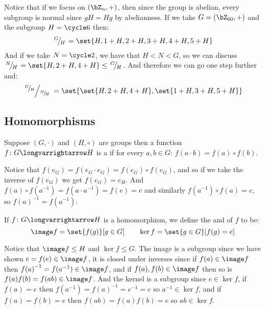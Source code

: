 \documentclass[10pt]{article}
\def\slfrac#1#2{\left.{}^{#1}\mkern-4mu\middle/\mkern-3mu{}_{#2}\right.}
\begin{document}


\bigskip

Notice that if we focus on $(\bZ_n,+)$, then since the group is abelian, every subgroup is normal since $gH=Hg$ by abelianness.
If we take $G=(\bZ_{60},+)$ and the subgroup $H=\cycle 6$ then:
\[ \slfrac GH = \set{H, 1+H, 2+H, 3+H, 4+H, 5+H} \]
And if we take $N=\cycle 2$, we have that $H<N<G$, so we can discuss $\slfrac NH=\set{H, 2+H, 4+H}\leq\slfrac GH$.
And therefore we can go one step further and:
\[ \slfrac{\slfrac GH}{\slfrac NH} = \set{\set{H, 2+H, 4+H}, \set{1+H, 3+H, 5+H}} \]

\subsection{Homomorphisms}

\begin{defn*}

    Suppose $(G,\cdot)$ and $(H,\circ)$ are groups then a function $f\colon G\longvarrightarrow H$ is a  if for every $a,b\in G$: $f(a\cdot b)=f(a)\circ f(b)$.

\end{defn*}

Notice that $f(e_G)=f(e_G\cdot e_G)=f(e_G)\circ f(e_G)$, and so if we take the inverse of $f(e_G)$ we get $f(e_G)=e_H$.
And $f(a)\circ f(a^{-1})=f(a\cdot a^{-1})=f(e)=e$ and similarly $f(a^{-1})\circ f(a)=e$, so ${f(a)}^{-1}=f(a^{-1})$.

\begin{defn*}

    If $f\colon G\longvarrightarrow H$ is a homomorphism, we define the  and  of $f$ to be:
    \[ \image f = \set{f(g)}[g\in G] \qquad \ker f = \set{g\in G}[f(g)=e] \]

\end{defn*}

Notice that $\image f\leq H$ and $\ker f\leq G$.
The image is a subgroup since we have shown $e=f(e)\in\image f$, it is closed under inverses since if $f(a)\in\image f$ then ${f(a)}^{-1}=f(a^{-1})\in\image f$, and if $f(a),f(b)\in\image f$ then so is
$f(a)f(b)=f(ab)\in\image f$.
And the kernel is a subgroup since $e\in\ker f$, if $f(a)=e$ then $f(a^{-1})={f(a)}^{-1}=e^{-1}=e$ so $a^{-1}\in\ker f$, and if $f(a)=f(b)=e$ then $f(ab)=f(a)f(b)=e$ so $ab\in\ker f$.
\end{document}
